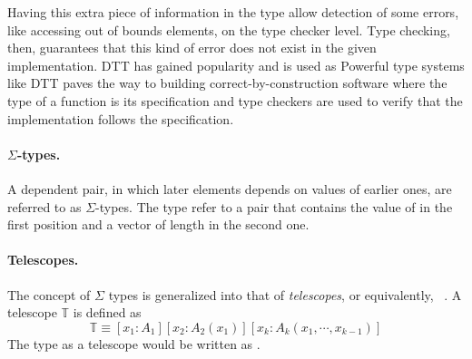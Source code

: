 Having this extra piece of information in the type allow detection of some errors, like accessing out of bounds elements, on the type checker level. Type checking, then, guarantees that this kind of error does not exist in the given implementation. 
DTT has gained popularity and is used as 
Powerful type systems like DTT paves the way to building correct-by-construction software where the type of a function is its specification and type checkers are used to verify that the implementation follows the specification. 


\paragraph{$\Sigma$-types.}
A dependent pair, in which later elements depends on values of earlier ones, are referred to as $\Sigma$-types. The type  refer to a pair that contains the value of  in the first position and a vector of length  in the second one. 

\paragraph{Telescopes.}
The concept of $\Sigma$ types is generalized into that of \emph{telescopes}, or equivalently,  ~\cite{pollack2002dependently}. A telescope $\mathbb{T}$ is defined as 
\begin{equation}
\mathbb{T} \equiv [x_1 : A_1][x_2 : A_2(x_1)][x_k : A_k(x_1,\cdots,x_{k-1})]
\label{eq:telescope}
\end{equation} 
The type  as a telescope would be written as 
\lstmath{[A : Set][n : Nat][Vec A n]}. 


